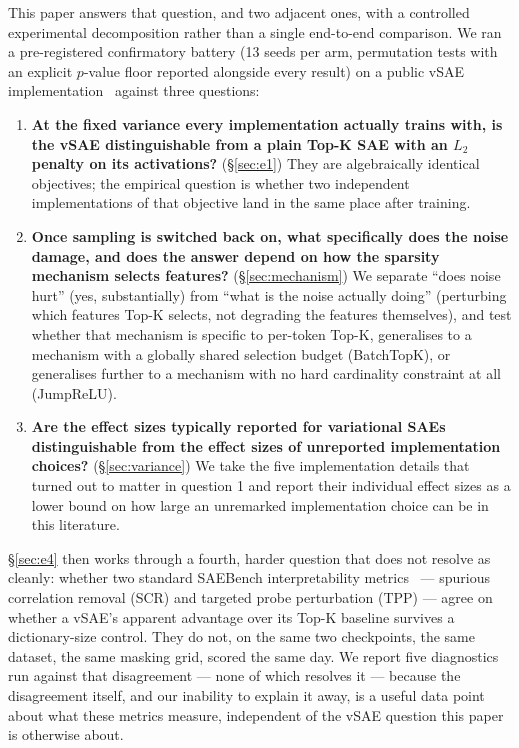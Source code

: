 \documentclass[11pt]{article}
\begin{document}
This paper answers that question, and two adjacent ones, with a controlled
experimental decomposition rather than a single end-to-end comparison. We ran
a pre-registered confirmatory battery (13 seeds per arm, permutation tests
with an explicit $p$-value floor reported alongside every result) on a
public vSAE
implementation~\citep{marks2024dictionary_learning} against three questions:

\begin{enumerate}
\item \textbf{At the fixed variance every implementation actually trains
  with, is the vSAE distinguishable from a plain Top-K SAE with an $L_2$
  penalty on its activations?} (\S\ref{sec:e1}) They are algebraically
  identical objectives; the empirical question is whether two independent
  implementations of that objective land in the same place after training.
\item \textbf{Once sampling is switched back on, what specifically does the
  noise damage, and does the answer depend on how the sparsity mechanism
  selects features?} (\S\ref{sec:mechanism}) We separate ``does noise hurt''
  (yes, substantially) from ``what is the noise actually doing'' (perturbing
  which features Top-K selects, not degrading the features themselves), and
  test whether that mechanism is specific to per-token Top-K, generalises to
  a mechanism with a globally shared selection budget (BatchTopK), or
  generalises further to a mechanism with no hard cardinality constraint at
  all (JumpReLU).
\item \textbf{Are the effect sizes typically reported for variational SAEs
  distinguishable from the effect sizes of unreported implementation
  choices?} (\S\ref{sec:variance}) We take the five implementation details
  that turned out to matter in question 1 and report their individual effect
  sizes as a lower bound on how large an unremarked implementation choice can
  be in this literature.
\end{enumerate}

\S\ref{sec:e4} then works through a fourth, harder question that does not
resolve as cleanly: whether two standard SAEBench interpretability
metrics~\citep{karvonen2025saebenchcomprehensivebenchmarksparse} --- spurious
correlation removal (SCR) and targeted probe perturbation (TPP) --- agree on
whether a vSAE's apparent advantage over its Top-K baseline survives a
dictionary-size control. They do not, on the same two checkpoints, the same
dataset, the same masking grid, scored the same day. We report five
diagnostics run against that disagreement --- none of which resolves it ---
because the disagreement itself, and our inability to explain it away, is a
useful data point about what these metrics measure, independent of the
vSAE question this paper is otherwise about.
\end{document}
